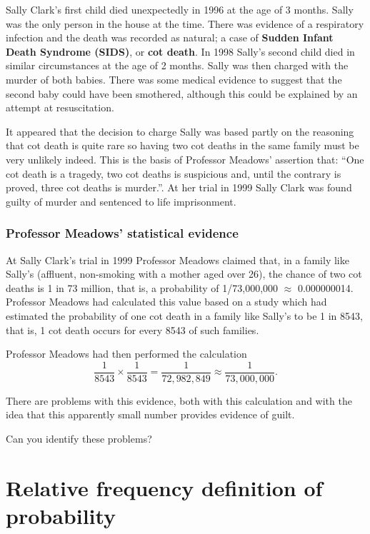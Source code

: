 \documentclass[
  british,
  11pt,
  openany, a4paper]{book}
\begin{document}
Sally Clark's first child died unexpectedly in 1996 at the age of 3 months. Sally was the only person in the house at the time. There was evidence of a respiratory infection and the death was recorded as natural; a case of \textbf{Sudden Infant Death Syndrome (SIDS)}, or \textbf{cot death}. In 1998 Sally's second child died in similar circumstances at the age of 2 months. Sally was then charged with the murder of both babies. There was some medical evidence to suggest that the second baby could have been smothered, although this could be explained by an attempt at resuscitation.

It appeared that the decision to charge Sally was based partly on the reasoning that cot death is quite rare so having two cot deaths in the same family must be very unlikely indeed. This is the basis of Professor Meadows' assertion that: ``One cot death is a tragedy, two cot deaths is suspicious and, until the contrary is proved, three cot deaths is murder.''. At her trial in 1999 Sally Clark was found guilty of murder and sentenced to life imprisonment.

\subsubsection*{Professor Meadows' statistical evidence}\label{professor-meadows-statistical-evidence}

At Sally Clark's trial in 1999 Professor Meadows claimed that, in a family like Sally's (affluent, non-smoking with a mother aged over 26), the chance of two cot deaths is 1 in 73 million, that is, a probability of 1/73,000,000 \(\approx\) 0.000000014. Professor Meadows had calculated this value based on a study which had estimated the probability of one cot death in a family like Sally's to be 1 in 8543, that is, 1 cot death occurs for every 8543 of such families.

Professor Meadows had then performed the calculation
\[\frac{1}{8543}\times\frac{1}{8543}=\frac{1}{72,982,849}\approx\frac{1}{73,000,000}.\]

There are problems with this evidence, both with this calculation and with the idea that this apparently small number provides evidence of guilt.

Can you identify these problems?

\section{Relative frequency definition of probability}\label{relative-frequency-definition-of-probability}
\end{document}
